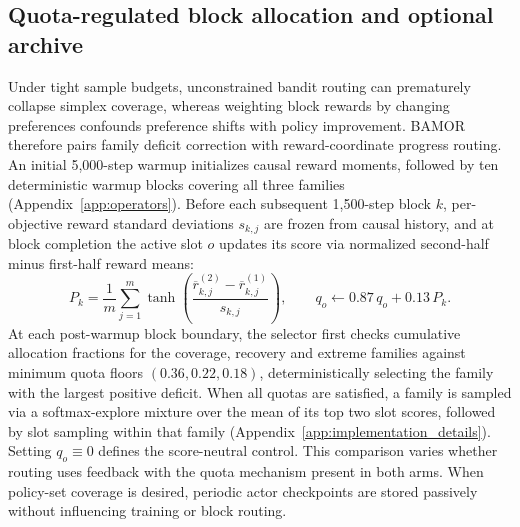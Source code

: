 \subsection{Quota-regulated block allocation and optional archive}
\label{sec:method_v25}

Under tight sample budgets, unconstrained bandit routing can prematurely
collapse simplex coverage, whereas weighting block rewards by changing
preferences confounds preference shifts with policy improvement. BAMOR
therefore pairs family deficit correction with reward-coordinate
progress routing. An initial 5,000-step warmup initializes causal reward
moments, followed by ten deterministic warmup blocks covering all three
families (Appendix~\ref{app:operators}). Before each subsequent 1,500-step
block $k$, per-objective reward standard deviations $s_{k,j}$ are frozen from
causal history, and at block completion the active slot $o$ updates its score
via normalized second-half minus first-half reward means:
\begin{equation}
 P_k = \frac{1}{m}\sum_{j=1}^m\tanh\!\left(
 \frac{\overline{r}^{(2)}_{k,j} - \overline{r}^{(1)}_{k,j}}{s_{k,j}}\right),
 \qquad q_o \leftarrow 0.87\,q_o + 0.13\,P_k.
 \label{eq:v25_progress}
\end{equation}
At each post-warmup block boundary, the selector first checks cumulative
allocation fractions for the coverage, recovery and extreme families against
minimum quota floors $(0.36, 0.22, 0.18)$, deterministically selecting the
family with the largest positive deficit. When all quotas are satisfied, a
family is sampled via a softmax-explore mixture over the mean of its top two
slot scores, followed by slot sampling within that family
(Appendix~\ref{app:implementation_details}). Setting $q_o \equiv 0$ defines the
score-neutral control. This comparison varies whether routing uses feedback
with the quota mechanism present in both arms.
When policy-set coverage is desired, periodic actor checkpoints are stored passively
without influencing training or block routing.


